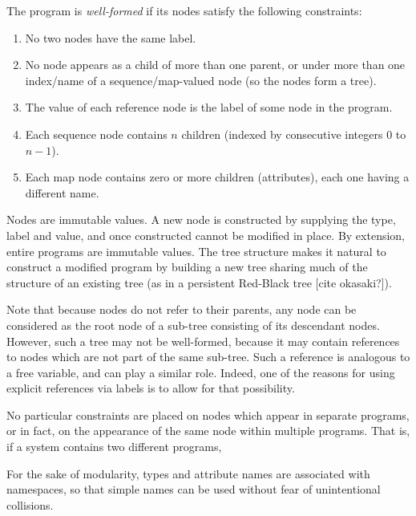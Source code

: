 The program is \emph{well-formed} if its nodes satisfy the following constraints:
\begin{enumerate}
\item No two nodes have the same label.
\item No node appears as a child of more than one parent, or under more than one index/name of a sequence/map-valued node (so the nodes form a tree).
\item The value of each reference node is the label of some node in the program.
\item Each sequence node contains $n$ children (indexed by consecutive integers $0$ to $n-1$).
\item Each map node contains zero or more children (attributes), each one having a different name.
\end{enumerate}


Nodes are immutable values. A new node is constructed by supplying the type, label and value, and once constructed cannot be modified in place. By extension, entire programs are immutable values. The tree structure makes it natural to construct a modified program by building a new tree sharing much of the structure of an existing tree (as in a persistent Red-Black tree [cite okasaki?]).

Note that because nodes do not refer to their parents, any node can be considered as the root node of a sub-tree consisting of its descendant nodes. However, such a tree may not be well-formed, because it may contain references to nodes which are not part of the same sub-tree. Such a reference is analogous to a free variable, and can play a similar role. Indeed, one of the reasons for using explicit references via labels is to allow for that possibility.

No particular constraints are placed on nodes which appear in separate programs, or in fact, on the appearance of the same node within multiple programs. That is, if a system contains two different programs, \todo{}

For the sake of modularity, types and attribute names are associated with namespaces, so that simple names can be used without fear of unintentional collisions. 


